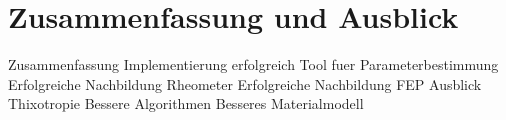 \section{Zusammenfassung und Ausblick}
\begin{todocontent}
    \1 Zusammenfassung
        \2 Implementierung erfolgreich
        \2 Tool fuer Parameterbestimmung
        \2 Erfolgreiche Nachbildung Rheometer
        \2 Erfolgreiche Nachbildung FEP%
    \1 Ausblick
        \2 Thixotropie
        \2 Bessere Algorithmen
        \2 Besseres Materialmodell
\end{todocontent}
